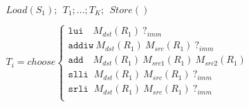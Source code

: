 \[
\begin{array}{l}
Load(S_1); \ \ T_1; \ldots; T_K; \ \ Store() \\ \ \\
T_i = choose
\begin{cases}
  \texttt{lui  }\ \ \ M_{dst}(R_1)\ \textbf{?}_{imm}\\
  \texttt{addiw}\ M_{dst}(R_1)\ M_{src}(R_1)\ \textbf{?}_{imm}\\
  \texttt{add  }\ \ \ M_{dst}(R_1)\ M_{src1}(R_1)\ M_{src2}(R_1)\\
  \texttt{slli }\ M_{dst}(R_1)\ M_{src}(R_1)\ \textbf{?}_{imm}\\
  \texttt{srli }\ M_{dst}(R_1)\ M_{src}(R_1)\ \textbf{?}_{imm}\\
\end{cases}\\
\end{array}
\]

